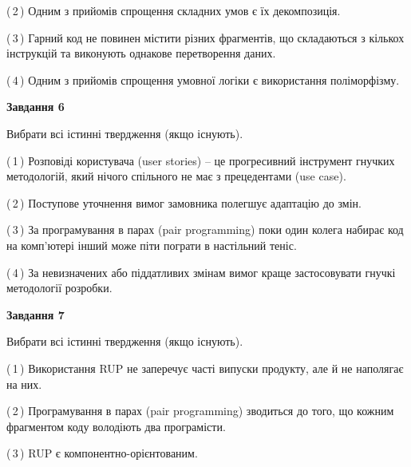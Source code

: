\documentclass[10pt, ukrainian]{article}
\begin{document}
{\begin {large}
(\,2\,) Одним з прийомів спрощення складних умов є їх декомпозиція. %



(\,3\,) Гарний код не повинен містити різних фрагментів, що складаються з кількох інструкцій та виконують однакове перетворення даних. %



(\,4\,) Одним з прийомів спрощення умовної логіки є використання поліморфізму. %

\newpage

{\begin {center}\textbf{Завдання 6}\end {center}}\par
Вибрати всі істинні твердження (якщо існують).\par
\vspace{2mm}



(\,1\,) Розповіді користувача (user stories) – це прогресивний інструмент гнучких методологій, який нічого спільного не має з прецедентами (use case). %



(\,2\,) Поступове уточнення вимог замовника полегшує адаптацію до змін. %



(\,3\,) За програмування в парах (pair programming) поки один колега набирає код на комп'ютері інший може піти пограти в настільний теніс. %



(\,4\,) За невизначених або піддатливих змінам вимог краще застосовувати гнучкі методології розробки. %


{\begin {center}\textbf{Завдання 7}\end {center}}\par
Вибрати всі істинні твердження (якщо існують).\par
\vspace{2mm}



(\,1\,) Використання RUP не заперечує часті випуски продукту, але й не наполягає на них. %



(\,2\,) Програмування в парах (pair programming) зводиться до того, що кожним фрагментом коду володіють два програмісти. %



(\,3\,) RUP є компонентно-орієнтованим. %




\end{large}}
\end{document}
